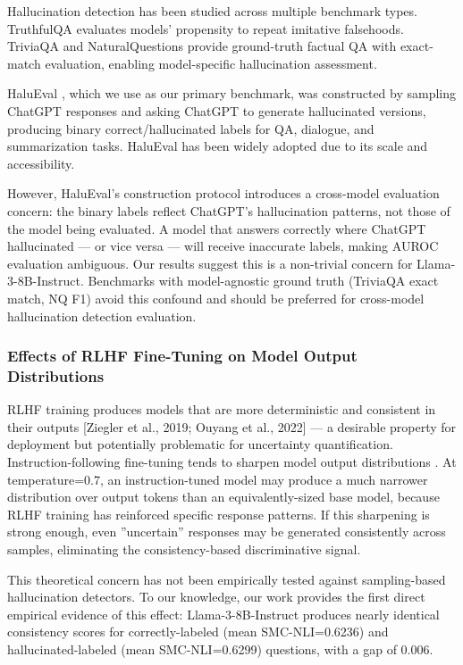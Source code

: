 Hallucination detection has been studied across multiple benchmark types. TruthfulQA \citep{Lin2022TruthfulQA} evaluates models' propensity to repeat imitative falsehoods. TriviaQA \citep{Joshi2017} and NaturalQuestions \citep{Kwiatkowski2019} provide ground-truth factual QA with exact-match evaluation, enabling model-specific hallucination assessment.

HaluEval \citep{Li2023HaluEval}, which we use as our primary benchmark, was constructed by sampling ChatGPT responses and asking ChatGPT to generate hallucinated versions, producing binary correct/hallucinated labels for QA, dialogue, and summarization tasks. HaluEval has been widely adopted due to its scale and accessibility.

However, HaluEval's construction protocol introduces a cross-model evaluation concern: the binary labels reflect ChatGPT's hallucination patterns, not those of the model being evaluated. A model that answers correctly where ChatGPT hallucinated --- or vice versa --- will receive inaccurate labels, making AUROC evaluation ambiguous. Our results suggest this is a non-trivial concern for Llama-3-8B-Instruct. Benchmarks with model-agnostic ground truth (TriviaQA exact match, NQ F1) avoid this confound and should be preferred for cross-model hallucination detection evaluation.

\subsubsection{Effects of RLHF Fine-Tuning on Model Output Distributions}

RLHF training produces models that are more deterministic and consistent in their outputs [Ziegler et al., 2019; Ouyang et al., 2022] --- a desirable property for deployment but potentially problematic for uncertainty quantification. Instruction-following fine-tuning tends to sharpen model output distributions \citep{Bai2022Training}. At temperature=0.7, an instruction-tuned model may produce a much narrower distribution over output tokens than an equivalently-sized base model, because RLHF training has reinforced specific response patterns. If this sharpening is strong enough, even ''uncertain'' responses may be generated consistently across samples, eliminating the consistency-based discriminative signal.

This theoretical concern has not been empirically tested against sampling-based hallucination detectors. To our knowledge, our work provides the first direct empirical evidence of this effect: Llama-3-8B-Instruct produces nearly identical consistency scores for correctly-labeled (mean SMC-NLI=0.6236) and hallucinated-labeled (mean SMC-NLI=0.6299) questions, with a gap of 0.006.

